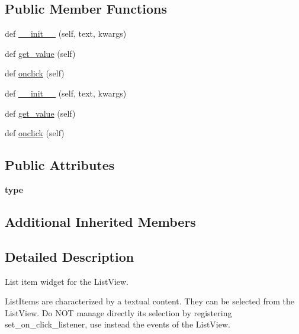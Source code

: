 \subsection*{Public Member Functions}
\begin{DoxyCompactItemize}
\item 
def \hyperlink{classremi_1_1gui_1_1ListItem_af778922b9d51e37a3f7bf98aa93ecc54}{\+\_\+\+\_\+init\+\_\+\+\_\+} (self, text, kwargs)
\item 
def \hyperlink{classremi_1_1gui_1_1ListItem_ab2dff2b03f6c88f3caebea53481db957}{get\+\_\+value} (self)
\item 
def \hyperlink{classremi_1_1gui_1_1ListItem_ae04f42afb8aeaba38d602912d2fc4736}{onclick} (self)
\item 
def \hyperlink{classremi_1_1gui_1_1ListItem_af778922b9d51e37a3f7bf98aa93ecc54}{\+\_\+\+\_\+init\+\_\+\+\_\+} (self, text, kwargs)
\item 
def \hyperlink{classremi_1_1gui_1_1ListItem_ab2dff2b03f6c88f3caebea53481db957}{get\+\_\+value} (self)
\item 
def \hyperlink{classremi_1_1gui_1_1ListItem_ae04f42afb8aeaba38d602912d2fc4736}{onclick} (self)
\end{DoxyCompactItemize}
\subsection*{Public Attributes}
\begin{DoxyCompactItemize}
\item 
{\bfseries type}\hypertarget{classremi_1_1gui_1_1ListItem_acb0badfd2f0d808c4902cc73d1d3c158}{}\label{classremi_1_1gui_1_1ListItem_acb0badfd2f0d808c4902cc73d1d3c158}

\end{DoxyCompactItemize}
\subsection*{Additional Inherited Members}


\subsection{Detailed Description}
\begin{DoxyVerb}List item widget for the ListView.

ListItems are characterized by a textual content. They can be selected from
the ListView. Do NOT manage directly its selection by registering set_on_click_listener, use instead the events of
the ListView.
\end{DoxyVerb}
 

